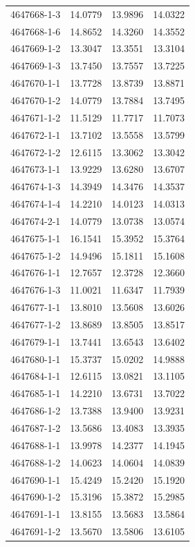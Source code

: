 \begin{longtable}{lrrr}
4647668-1-3 & 14.0779 & 13.9896 & 14.0322 \\
4647668-1-6 & 14.8652 & 14.3260 & 14.3552 \\
4647669-1-2 & 13.3047 & 13.3551 & 13.3104 \\
4647669-1-3 & 13.7450 & 13.7557 & 13.7225 \\
4647670-1-1 & 13.7728 & 13.8739 & 13.8871 \\
4647670-1-2 & 14.0779 & 13.7884 & 13.7495 \\
4647671-1-2 & 11.5129 & 11.7717 & 11.7073 \\
4647672-1-1 & 13.7102 & 13.5558 & 13.5799 \\
4647672-1-2 & 12.6115 & 13.3062 & 13.3042 \\
4647673-1-1 & 13.9229 & 13.6280 & 13.6707 \\
4647674-1-3 & 14.3949 & 14.3476 & 14.3537 \\
4647674-1-4 & 14.2210 & 14.0123 & 14.0313 \\
4647674-2-1 & 14.0779 & 13.0738 & 13.0574 \\
4647675-1-1 & 16.1541 & 15.3952 & 15.3764 \\
4647675-1-2 & 14.9496 & 15.1811 & 15.1608 \\
4647676-1-1 & 12.7657 & 12.3728 & 12.3660 \\
4647676-1-3 & 11.0021 & 11.6347 & 11.7939 \\
4647677-1-1 & 13.8010 & 13.5608 & 13.6026 \\
4647677-1-2 & 13.8689 & 13.8505 & 13.8517 \\
4647679-1-1 & 13.7441 & 13.6543 & 13.6402 \\
4647680-1-1 & 15.3737 & 15.0202 & 14.9888 \\
4647684-1-1 & 12.6115 & 13.0821 & 13.1105 \\
4647685-1-1 & 14.2210 & 13.6731 & 13.7022 \\
4647686-1-2 & 13.7388 & 13.9400 & 13.9231 \\
4647687-1-2 & 13.5686 & 13.4083 & 13.3935 \\
4647688-1-1 & 13.9978 & 14.2377 & 14.1945 \\
4647688-1-2 & 14.0623 & 14.0604 & 14.0839 \\
4647690-1-1 & 15.4249 & 15.2420 & 15.1920 \\
4647690-1-2 & 15.3196 & 15.3872 & 15.2985 \\
4647691-1-1 & 13.8155 & 13.5683 & 13.5864 \\
4647691-1-2 & 13.5670 & 13.5806 & 13.6105 \\

\end{longtable}
